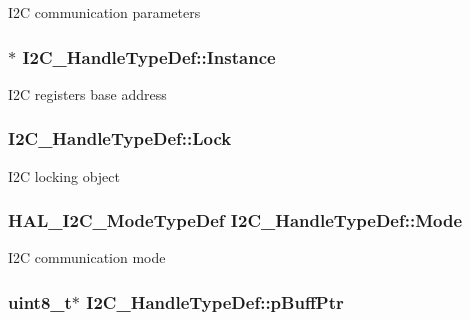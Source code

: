 I2\-C communication parameters \hypertarget{struct_i2_c___handle_type_def_ad83b15a12a41fb3958c55085adf931dd}{
\subsubsection[{Instance}]{$\ast$ I2\-C\-\_\-\-Handle\-Type\-Def\-::\-Instance}}\label{struct_i2_c___handle_type_def_ad83b15a12a41fb3958c55085adf931dd}
I2\-C registers base address \hypertarget{struct_i2_c___handle_type_def_af28a07c34f97e2b2ade505357a467a50}{
\subsubsection[{Lock}]{ I2\-C\-\_\-\-Handle\-Type\-Def\-::\-Lock}}\label{struct_i2_c___handle_type_def_af28a07c34f97e2b2ade505357a467a50}
I2\-C locking object \hypertarget{struct_i2_c___handle_type_def_a97b1beafd59ed47be4b742562d100278}{
\subsubsection[{Mode}]{ {\bf H\-A\-L\-\_\-\-I2\-C\-\_\-\-Mode\-Type\-Def} I2\-C\-\_\-\-Handle\-Type\-Def\-::\-Mode}}\label{struct_i2_c___handle_type_def_a97b1beafd59ed47be4b742562d100278}
I2\-C communication mode \hypertarget{struct_i2_c___handle_type_def_a6adc95451a3eec4b104564fc3fe8b109}{
\subsubsection[{p\-Buff\-Ptr}]{\setlength{\rightskip}{0pt plus 5cm}uint8\-\_\-t$\ast$ I2\-C\-\_\-\-Handle\-Type\-Def\-::p\-Buff\-Ptr}}\label{struct_i2_c___handle_type_def_a6adc95451a3eec4b104564fc3fe8b109}
